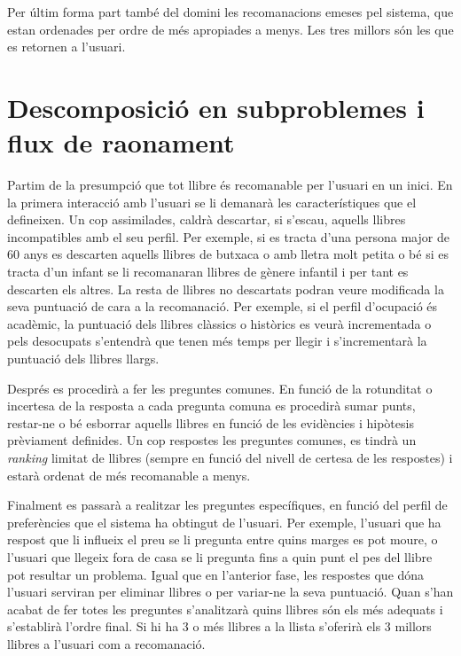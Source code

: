 Per últim forma part també del domini les recomanacions emeses pel sistema, que estan ordenades per ordre de més apropiades a menys. Les tres millors són les que es retornen a l'usuari.

\section{Descomposició en subproblemes i flux de raonament}

Partim de la presumpció que tot llibre és recomanable per l'usuari en un inici. En la primera interacció amb l'usuari se li demanarà les característiques que el defineixen. Un cop assimilades, caldrà descartar, si s'escau, aquells llibres incompatibles amb el seu perfil. Per exemple, si es tracta d'una persona major de 60 anys es descarten aquells llibres de butxaca o amb lletra molt petita o bé si es tracta d'un infant se li recomanaran llibres de gènere infantil i per tant es descarten els altres. La resta de llibres no descartats podran veure modificada la seva puntuació de cara a la recomanació. Per exemple, si el perfil d'ocupació és acadèmic, la puntuació dels llibres clàssics o històrics es veurà incrementada o pels desocupats s'entendrà que tenen més temps per llegir i s'incrementarà la puntuació dels llibres llargs. 

Després es procedirà a fer les preguntes comunes. En funció de la rotunditat o incertesa de la resposta a cada pregunta comuna es procedirà sumar punts, restar-ne o bé esborrar aquells llibres en funció de les evidències i hipòtesis prèviament definides. Un cop respostes les preguntes comunes, es tindrà un \emph{ranking} limitat de llibres (sempre en funció del nivell de certesa de les respostes) i estarà ordenat de més recomanable a menys.

Finalment es passarà a realitzar les preguntes específiques, en funció del perfil de preferències que el sistema ha obtingut de l'usuari. Per exemple, l'usuari que ha respost que li influeix el preu se li pregunta entre quins marges es pot moure, o l'usuari que llegeix fora de casa se li pregunta fins a quin punt el pes del llibre pot resultar un problema. Igual que en l'anterior fase, les respostes que dóna l'usuari serviran per eliminar llibres o per variar-ne la seva puntuació. Quan s'han acabat de fer totes les preguntes s'analitzarà quins llibres són els més adequats i s'establirà l'ordre final. Si hi ha 3 o més llibres a la llista s'oferirà els 3 millors llibres a l'usuari com a recomanació.


